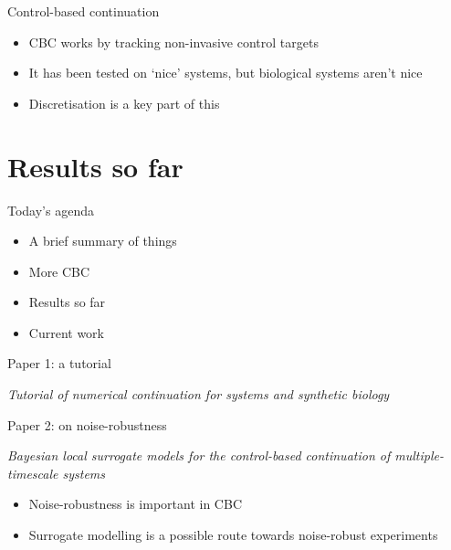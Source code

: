 \documentclass[presentation]{beamer}
\begin{document}
\begin{frame}[label={sec:org71ac3ec}]{Control-based continuation}
\begin{itemize}
\item CBC works by tracking non-invasive control targets
\end{itemize}
\vfill
\begin{itemize}
\item It has been tested on `nice' systems, but biological systems aren't nice
\end{itemize}
\vfill
\begin{itemize}
\item Discretisation is a key part of this
\end{itemize}
\end{frame}

\section{Results so far}
\label{sec:org98f68ad}
\begin{frame}[label={sec:org1478ea0}]{Today's agenda}
\begin{itemize}
\item A brief summary of things
\end{itemize}
\vfill
\begin{itemize}
\item More CBC
\end{itemize}
\vfill
\begin{itemize}
\item \alert{Results so far}
\end{itemize}
\vfill
\begin{itemize}
\item Current work
\end{itemize}
\vfill
\end{frame}


\begin{frame}[label={sec:org6316f3a}]{Paper 1: a tutorial}
\begin{center}
\emph{\alert{Tutorial of numerical continuation for systems and synthetic biology}}
\end{center}
\end{frame}

\begin{frame}[label={sec:orgae18966}]{Paper 2: on noise-robustness}
\begin{center}
\emph{\alert{Bayesian local surrogate models for the control-based continuation of multiple-timescale systems}}
\end{center}
\vfill
\begin{itemize}
\item Noise-robustness is important in CBC
\end{itemize}
\vfill
\begin{itemize}
\item Surrogate modelling is a possible route towards noise-robust experiments
\end{itemize}
\end{frame}
\end{document}
